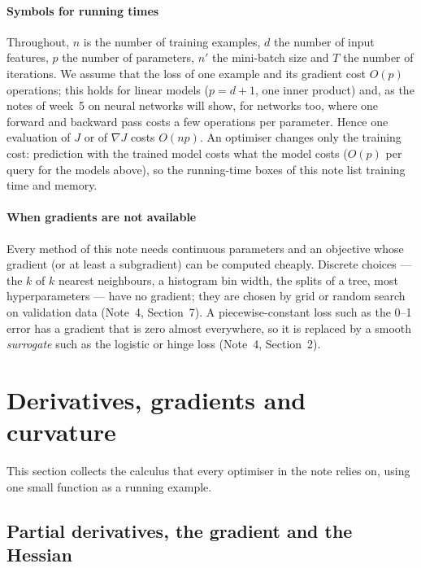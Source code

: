\documentclass[11pt]{article}
\begin{document}
\paragraph{Symbols for running times} Throughout, $n$ is the number of training examples, $d$ the number of input
features, $p$ the number of parameters, $n'$ the mini-batch size and $T$ the number of iterations. We assume that the
loss of one example and its gradient cost $O(p)$ operations; this holds for linear models ($p = d + 1$, one inner
product) and, as the notes of week~5 on neural networks will show, for networks too, where one forward and backward
pass costs a few operations per parameter. Hence one evaluation of $J$ or of $\nabla J$ costs $O(np)$. An optimiser
changes only the training cost: prediction with the trained model costs what the model costs ($O(p)$ per query for the
models above), so the running-time boxes of this note list training time and memory.

\paragraph{When gradients are not available} Every method of this note needs continuous parameters and an objective
whose gradient (or at least a subgradient) can be computed cheaply. Discrete choices --- the $k$ of $k$ nearest
neighbours, a histogram bin width, the splits of a tree, most hyperparameters --- have no gradient; they are chosen by
grid or random search on validation data (Note~4, Section~7). A piecewise-constant loss such as the 0--1 error has a
gradient that is zero almost everywhere, so it is replaced by a smooth \emph{surrogate} such as the logistic or hinge
loss (Note~4, Section~2).

\section{Derivatives, gradients and curvature}\label{sec:calculus}

This section collects the calculus that every optimiser in the note relies on, using one small function as a
running example.

\subsection{Partial derivatives, the gradient and the Hessian}\label{sec:grad}
\end{document}
